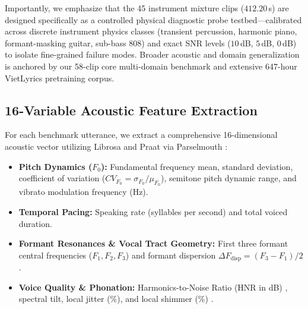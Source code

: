 Importantly, we emphasize that the 45 instrument mixture clips ($412.20$\,s) are designed specifically as a controlled physical diagnostic probe testbed---calibrated across discrete instrument physics classes (transient percussion, harmonic piano, formant-masking guitar, sub-bass 808) and exact SNR levels ($10$\,dB, $5$\,dB, $0$\,dB) to isolate fine-grained failure modes. Broader acoustic and domain generalization is anchored by our 58-clip core multi-domain benchmark and extensive 647-hour VietLyrics pretraining corpus.

\subsection{16-Variable Acoustic Feature Extraction}
For each benchmark utterance, we extract a comprehensive 16-dimensional acoustic vector utilizing Librosa \cite{mcfee2015librosa} and Praat via Parselmouth \cite{boersma2002praat,jadoul2018parselmouth}:
\begin{itemize}
    \item \textbf{Pitch Dynamics ($F_0$):} Fundamental frequency mean, standard deviation, coefficient of variation ($CV_{F_0} = \sigma_{F_0}/\mu_{F_0}$), semitone pitch dynamic range, and vibrato modulation frequency (Hz).
    \item \textbf{Temporal Pacing:} Speaking rate (syllables per second) and total voiced duration.
    \item \textbf{Formant Resonances \& Vocal Tract Geometry:} First three formant central frequencies ($F_1, F_2, F_3$) and formant dispersion $\Delta F_{\text{disp}} = (F_3 - F_1)/2$ \cite{fitch1997vocal,fant1970acoustic}.
    \item \textbf{Voice Quality \& Phonation:} Harmonics-to-Noise Ratio (HNR in dB) \cite{yumoto1982harmonics}, spectral tilt, local jitter (\%), and local shimmer (\%) \cite{farrus2007jitter}.
\end{itemize}

